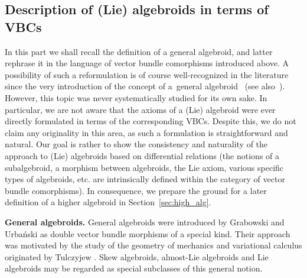 \documentclass[10pt,a4paper]{amsart}
\newcommand{\ZM}{{VBC}} %
\newcommand{\Zakrzewski}{{vector bundle comorphism}}
\numberwithin{equation}{section}
\theoremstyle{definition}
\begin{document}
\subsection{Description of (Lie) algebroids in terms of \ZM s}\label{ssec:alg_as_zm}
In this part we shall recall the definition of a general algebroid, and latter rephrase it in the language of \Zakrzewski s introduced above. A possibility of such a reformulation is of course well-recognized in the literature since the very introduction of the concept of a~general algebroid~\cite{JG_PU_Algebroids_1999} (see also~\cite{Leon_Marrero_Martinez_2005,Martinez_2008}). However, this topic was never systematically studied for its own sake. In particular, we are not aware that the axioms of a (Lie) algebroid were ever directly formulated in terms of the corresponding \ZM s. Despite this, we do not claim any originality in this area, as such a formulation is straightforward and natural. Our goal is rather to show the consistency and naturality of the approach to (Lie) algebroids based on differential relations (the notions of a subalgebroid, a morphism between algebroids, the Lie axiom, various specific types of algebroids, etc. are intrinsically defined within the category of \Zakrzewski s). In consequence, we prepare the ground for a later definition of a higher algebroid in Section~\ref{sec:high_alg}.

{\bf General algebroids.} General algebroids were introduced by Grabowski and Urba\'nski \mbox{\cite{JG_PU_Lie_alg_P-N_str_1997,JG_PU_Algebroids_1999}} as double vector bundle morphisms of a special kind. Their approach was motivated by the study of the geometry of mechanics and variational calculus originated by Tulczyjew \cite{Tulczyjew_1976,Tulczyjew_1976a}. Skew algebroids, almost-Lie algebroids and Lie algebroids may be regarded as special subclasses of this general notion.
\end{document}
